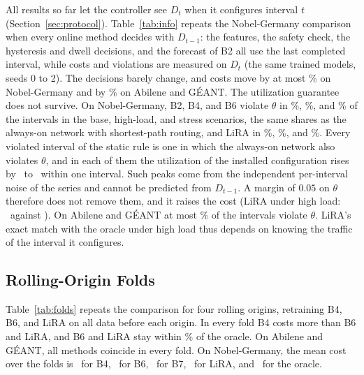 \documentclass[journal]{IEEEtran}
\begin{document}
All results so far let the controller see $D_t$ when it configures interval $t$ (Section~\ref{sec:protocol}). Table~\ref{tab:info} repeats the Nobel-Germany comparison when every online method decides with $D_{t-1}$: the features, the safety check, the hysteresis and dwell decisions, and the forecast of B2 all use the last completed interval, while costs and violations are measured on $D_t$ (the same trained models, seeds 0 to 2). The decisions barely change, and costs move by at most \staleNobMaxDJ\% on Nobel-Germany and by \staleRealDJtext\% on Abilene and G\'{E}ANT. The utilization guarantee does not survive. On Nobel-Germany, B2, B4, and B6 violate $\theta$ in \staleBzerobase\%, \staleBzerohl\%, and \staleBzerost\% of the intervals in the base, high-load, and stress scenarios, the same shares as the always-on network with shortest-path routing, and LiRA in \staleLiRAViolbase\%, \staleLiRAViolhl\%, and \staleLiRAViolst\%. Every violated interval of the static rule is one in which the always-on network also violates $\theta$, and in each of them the utilization of the installed configuration rises by \staleJumpMin\ to \staleJumpMax\ within one interval. Such peaks come from the independent per-interval noise of the series and cannot be predicted from $D_{t-1}$. A margin of $0.05$ on $\theta$ therefore does not remove them, and it raises the cost (LiRA under high load: \marginLiRAhlJ\ against \nobJLiRAhl). On Abilene and G\'{E}ANT at most \staleRealMaxViol\% of the intervals violate $\theta$. LiRA's exact match with the oracle under high load thus depends on knowing the traffic of the interval it configures.

\begin{table}[t]
\centering
\caption{Nobel-Germany: Total Cost $J$ and Share of Intervals Violating $\theta$ When Every Online Method Knows $D_t$ or Decides with $D_{t-1}$, Without and With a Safety Margin of 0.05 (B4, B6, and LiRA: Mean over Seeds 0 to 2)}
\label{tab:info}
\scriptsize
\setlength{\tabcolsep}{3pt}

\end{table}

\subsection{Rolling-Origin Folds}

Table~\ref{tab:folds} repeats the comparison for four rolling origins, retraining B4, B6, and LiRA on all data before each origin. In every fold B4 costs more than B6 and LiRA, and B6 and LiRA stay within \foldMaxGap\% of the oracle. On Abilene and G\'{E}ANT, all methods coincide in every fold. On Nobel-Germany, the mean cost over the folds is \foldNobBFour\ for B4, \foldNobBSix\ for B6, \foldNobBSeven\ for B7, \foldNobLiRA\ for LiRA, and \foldNobO\ for the oracle.
\end{document}

